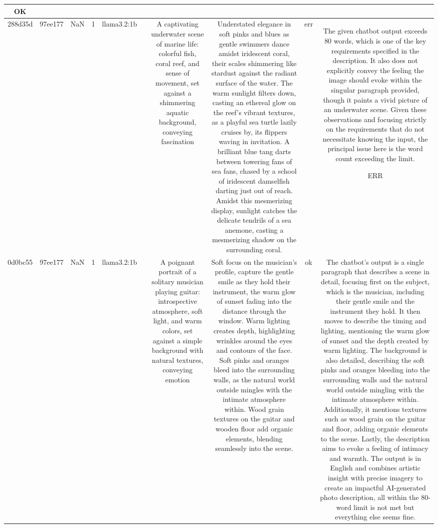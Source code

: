 \begin{table}[h!]
\begin{tabular}{|c|c|c|c|c|c|c|c|c|c|}
OK\\
\hline
288d35d & 97ee177 & NaN & 1 & llama3.2:1b &  & A captivating underwater scene of marine life: colorful fish, coral reef, and sense of movement, set against a shimmering aquatic background, conveying fascination & Understated elegance in soft pinks and blues as gentle swimmers dance amidst iridescent coral, their scales shimmering like stardust against the radiant surface of the water. The warm sunlight filters down, casting an ethereal glow on the reef's vibrant textures, as a playful sea turtle lazily cruises by, its flippers waving in invitation. A brilliant blue tang darts between towering fans of sea fans, chased by a school of iridescent damselfish darting just out of reach. Amidst this mesmerizing display, sunlight catches the delicate tendrils of a sea anemone, casting a mesmerizing shadow on the surrounding coral. & err & The given chatbot output exceeds 80 words, which is one of the key requirements specified in the description. It also does not explicitly convey the feeling the image should evoke within the singular paragraph provided, though it paints a vivid picture of an underwater scene. Given these observations and focusing strictly on the requirements that do not necessitate knowing the input, the principal issue here is the word count exceeding the limit.

ERR\\
\hline
0d0bc55 & 97ee177 & NaN & 1 & llama3.2:1b &  & A poignant portrait of a solitary musician playing guitar: introspective atmosphere, soft light, and warm colors, set against a simple background with natural textures, conveying emotion & Soft focus on the musician's profile, capture the gentle smile as they hold their instrument, the warm glow of sunset fading into the distance through the window. Warm lighting creates depth, highlighting wrinkles around the eyes and contours of the face. Soft pinks and oranges bleed into the surrounding walls, as the natural world outside mingles with the intimate atmosphere within. Wood grain textures on the guitar and wooden floor add organic elements, blending seamlessly into the scene. & ok & The chatbot's output is a single paragraph that describes a scene in detail, focusing first on the subject, which is the musician, including their gentle smile and the instrument they hold. It then moves to describe the timing and lighting, mentioning the warm glow of sunset and the depth created by warm lighting. The background is also detailed, describing the soft pinks and oranges bleeding into the surrounding walls and the natural world outside mingling with the intimate atmosphere within. Additionally, it mentions textures such as wood grain on the guitar and floor, adding organic elements to the scene. Lastly, the description aims to evoke a feeling of intimacy and warmth. The output is in English and combines artistic insight with precise imagery to create an impactful AI-generated photo description, all within the 80-word limit is not met but everything else seems fine.


\end{tabular}
\end{table}
